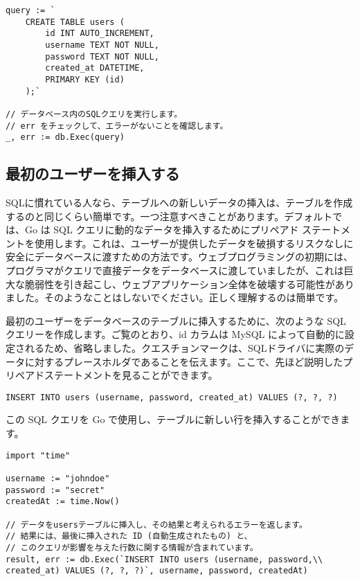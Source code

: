 \begin{lstlisting}[numbers=none]
    query := `
    CREATE TABLE users (
        id INT AUTO_INCREMENT,
        username TEXT NOT NULL,
        password TEXT NOT NULL,
        created_at DATETIME,
        PRIMARY KEY (id)
    );`

// データベース内のSQLクエリを実行します。
// err をチェックして、エラーがないことを確認します。
_, err := db.Exec(query)
\end{lstlisting}



\subsection{最初のユーザーを挿入する}

SQLに慣れている人なら、テーブルへの新しいデータの挿入は、テーブルを作成するのと同じくらい簡単です。一つ注意すべきことがあります。デフォルトでは、Go は SQL クエリに動的なデータを挿入するためにプリペアド ステートメントを使用します。これは、ユーザーが提供したデータを破損するリスクなしに安全にデータベースに渡すための方法です。ウェブプログラミングの初期には、プログラマがクエリで直接データをデータベースに渡していましたが、これは巨大な脆弱性を引き起こし、ウェブアプリケーション全体を破壊する可能性がありました。そのようなことはしないでください。正しく理解するのは簡単です。

最初のユーザーをデータベースのテーブルに挿入するために、次のような SQL クエリーを作成します。ご覧のとおり、id カラムは MySQL によって自動的に設定されるため、省略しました。クエスチョンマークは、SQLドライバに実際のデータに対するプレースホルダであることを伝えます。ここで、先ほど説明したプリペアドステートメントを見ることができます。



\begin{lstlisting}[numbers=none]
INSERT INTO users (username, password, created_at) VALUES (?, ?, ?)
\end{lstlisting}

この SQL クエリを Go で使用し、テーブルに新しい行を挿入することができます。


\begin{lstlisting}[numbers=none]
import "time"

username := "johndoe"
password := "secret"
createdAt := time.Now()

// データをusersテーブルに挿入し、その結果と考えられるエラーを返します。
// 結果には、最後に挿入された ID (自動生成されたもの) と、
// このクエリが影響を与えた行数に関する情報が含まれています。
result, err := db.Exec(`INSERT INTO users (username, password,\\
created_at) VALUES (?, ?, ?)`, username, password, createdAt)
\end{lstlisting}

